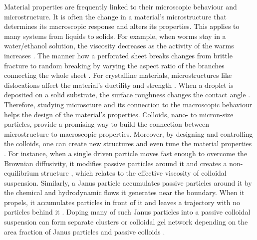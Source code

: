 \documentclass[12pt]{article}
\begin{document}
\iffalse
Material properties are frequently linked to their microscopic behaviour and microstructure. It is often the change in a material's microstructure that determines its macroscopic response and alters its properties. This applies to many systems from liquids to solids.
For example, when worms stay in a water/ethanol solution, the viscosity decreases as the activity of the warms increases \cite{deblais_rheology_2020}. The manner how a perforated sheet breaks changes from brittle fracture to random breaking by varying the aspect ratio of the branches connecting the whole sheet \cite{driscoll_role_2016}. For crystalline materials, microstructures like dislocations affect the material's ductility and strength \cite{chang_experimental_1981, chen_dislocation-density_2023}. When a droplet is deposited on a solid substrate, the surface roughness changes the contact angle \cite{guo_superhydrophobic_2011, didarul_islam_template-free_2022}.
%
Therefore, studying microscture and its connection to the macroscopic behaviour helps the design of the material's properties.
%
Colloids, nano- to micron-size particles, provide a promising way to build the connection between microstructure to macroscopic properties. Moreover, by designing and controlling the colloids, one can create new structures and even tune the material properties \cite{mallory_active_2018}.
%
For instance, when a single driven particle moves fast enough to overcome the Brownian diffusivity, it modifies passive particles around it and creates a non-equilibrium structure \cite{burkholder_nonlinear_2020, knezevic_oscillatory_2021, rafael_active_2022}, which relates to the effective viscosity of colloidal suspension.
%
Similarly, a Janus particle accumulates passive particles around it by the chemical and hydrodynamic flows it generates near the boundary. When it propels, it accumulates particles in front of it and leaves a trajectory with no particles behind it \cite{katuri_inferring_2021, singh_interaction_2022}.
Doping many of such Janus particles into a passive colloidal suspension can form separate clusters or colloidal gel network depending on the area fraction of Janus particles and passive colloids \cite{massana-cid_active_2018}.
\end{document}
